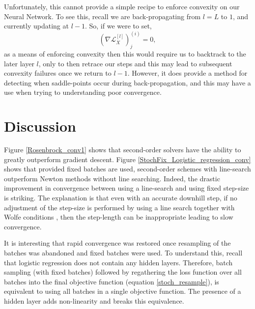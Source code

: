 \documentclass[nohyperref]{article}
\theoremstyle{plain}
\theoremstyle{definition}
\theoremstyle{remark}
\begin{document}
Unfortunately, this cannot provide a simple recipe to enforce convexity on our Neural Network. To see this, recall we are back-propagating from $l=L$ to $1$, and currently updating at $l-1$. So, if we were to set, 
\begin{equation}
\left(\nabla \mathcal{L}^{[l]}_{X}\right)_j^{(i)} = 0,
\end{equation}
as a means of enforcing convexity then this would require us to backtrack to the later layer $l$, only to then retrace our steps and this may lead to subsequent convexity failures once we return to $l-1$. However, it does provide a method for detecting when saddle-points occur during back-propagation, and this may have a use when trying to understanding poor convergence.

\section{Discussion}

Figure \ref{Rosenbrock_conv1} shows that second-order solvers have the ability to greatly outperform gradient descent. Figure \ref{StochFix_Logistic_regression_conv} shows that provided fixed batches are used, second-order schemes with line-search outperform Newton methods without line searching. Indeed, the drastic improvement in convergence between using a line-search and using fixed step-size is striking. The explanation is that even with an accurate downhill step, if no adjustment of the step-size is performed by using a line search together with Wolfe conditions \citep[see][]{Nocedal:Wright}, then the step-length can be inappropriate leading to slow convergence. 
 
It is interesting that rapid convergence was restored once resampling of the batches was abandoned and fixed batches were used. To understand this, recall that logistic regression does not contain any hidden layers. Therefore, batch sampling (with fixed batches) followed by regathering the loss function over all batches into the final objective function (equation \ref{stoch_resample}), is equivalent to using all batches in a single objective function. The presence of a hidden layer adds non-linearity and breaks this equivalence.
\end{document}
